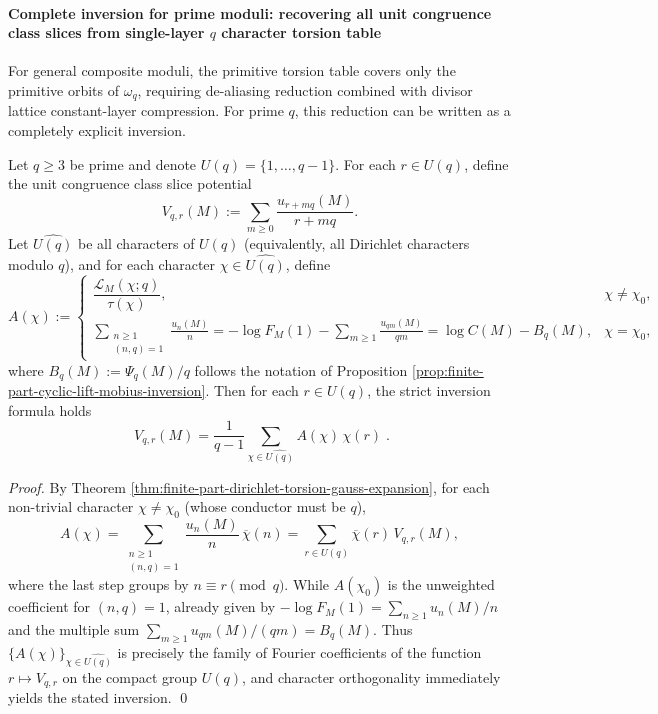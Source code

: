 \paragraph{Complete inversion for prime moduli: recovering all unit congruence class slices from single-layer \(q\) character torsion table}
For general composite moduli, the primitive torsion table covers only the primitive orbits of \(\omega_q\), requiring de-aliasing reduction combined with divisor lattice constant-layer compression.
For prime \(q\), this reduction can be written as a completely explicit inversion.

\begin{theorem}\label{thm:finite-part-dirichlet-character-inversion-prime}
Let \(q\ge3\) be prime and denote \(U(q)=\{1,\dots,q-1\}\).
For each \(r\in U(q)\), define the unit congruence class slice potential
\[
V_{q,r}(M):=\sum_{m\ge0}\frac{u_{r+mq}(M)}{r+mq}.
\]
Let \(\widehat{U(q)}\) be all characters of \(U(q)\) (equivalently, all Dirichlet characters modulo \(q\)), and for each character \(\chi\in\widehat{U(q)}\), define
\[
A(\chi):=
\begin{cases}
\dfrac{\mathcal{L}_M(\chi;q)}{\tau(\chi)}, & \chi\neq\chi_0,\\[10pt]
\displaystyle \sum_{\substack{n\ge1\\(n,q)=1}}\frac{u_n(M)}{n}
=-\log F_M(1)-\sum_{m\ge1}\frac{u_{qm}(M)}{qm}
=\log C(M)-B_q(M), & \chi=\chi_0,
\end{cases}
\]
where \(B_q(M):=\Psi_q(M)/q\) follows the notation of Proposition \ref{prop:finite-part-cyclic-lift-mobius-inversion}.
Then for each \(r\in U(q)\), the strict inversion formula holds
\[
\boxed{\;
V_{q,r}(M)=\frac{1}{q-1}\sum_{\chi\in\widehat{U(q)}}A(\chi)\,\chi(r)\; }.
\]
\end{theorem}
\begin{proof}
By Theorem \ref{thm:finite-part-dirichlet-torsion-gauss-expansion},
for each non-trivial character \(\chi\neq\chi_0\) (whose conductor must be \(q\)),
\[
A(\chi)
=\sum_{\substack{n\ge1\\(n,q)=1}}\frac{u_n(M)}{n}\,\overline{\chi}(n)
=\sum_{r\in U(q)}\overline{\chi}(r)\,V_{q,r}(M),
\]
where the last step groups by \(n\equiv r\pmod q\).
While \(A(\chi_0)\) is the unweighted coefficient for \((n,q)=1\), already given by \(-\log F_M(1)=\sum_{n\ge1}u_n(M)/n\) and the multiple sum \(\sum_{m\ge1}u_{qm}(M)/(qm)=B_q(M)\).
Thus \(\{A(\chi)\}_{\chi\in\widehat{U(q)}}\) is precisely the family of Fourier coefficients of the function \(r\mapsto V_{q,r}\) on the compact group \(U(q)\),
and character orthogonality immediately yields the stated inversion. \qed
\end{proof}

